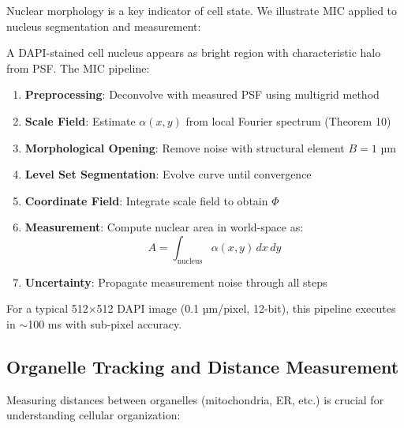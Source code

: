 \documentclass[twocolumn,11pt]{article}
\begin{document}
Nuclear morphology is a key indicator of cell state. We illustrate MIC applied to nucleus segmentation and measurement:

\begin{example}
A DAPI-stained cell nucleus appears as bright region with characteristic halo from PSF. The MIC pipeline:

\begin{enumerate}
\item \textbf{Preprocessing}: Deconvolve with measured PSF using multigrid method
\item \textbf{Scale Field}: Estimate $\alpha(x,y)$ from local Fourier spectrum (Theorem 10)
\item \textbf{Morphological Opening}: Remove noise with structural element $B = 1\text{ µm}$
\item \textbf{Level Set Segmentation}: Evolve curve until convergence
\item \textbf{Coordinate Field}: Integrate scale field to obtain $\Phi$
\item \textbf{Measurement}: Compute nuclear area in world-space as:
\begin{equation}
A = \int_{\text{nucleus}} \alpha(x,y) \, dx \, dy
\end{equation}
\item \textbf{Uncertainty}: Propagate measurement noise through all steps
\end{enumerate}

For a typical 512×512 DAPI image (0.1 µm/pixel, 12-bit), this pipeline executes in $\sim$100 ms with sub-pixel accuracy.
\end{example}

\subsection{Organelle Tracking and Distance Measurement}

Measuring distances between organelles (mitochondria, ER, etc.) is crucial for understanding cellular organization:
\end{document}
